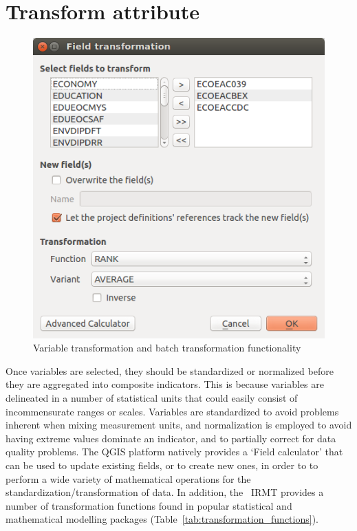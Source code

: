 \chapter{Transform attribute}

\begin{figure}
    \centering
    \includegraphics[width=\textwidth]{../images/image14}
    \caption{Variable transformation and batch transformation functionality}
    \label{fig:transform_attribute}
\end{figure}

Once variables are selected, they should be standardized or normalized before
they are aggregated into composite indicators. This is because variables are
delineated in a number of statistical units that could easily consist of
incommensurate ranges or scales. Variables are standardized to avoid problems
inherent when mixing measurement units, and normalization is employed to avoid
having extreme values dominate an indicator, and to partially correct for data
quality problems. The QGIS platform natively provides a `Field calculator' that
can be used to update existing fields, or to create new ones, in order to to
perform a wide variety of mathematical operations for the
standardization/transformation of data. In addition, the  IRMT provides a
number of transformation functions found in popular statistical and
mathematical modelling packages (Table~\ref{tab:transformation_functions}).

